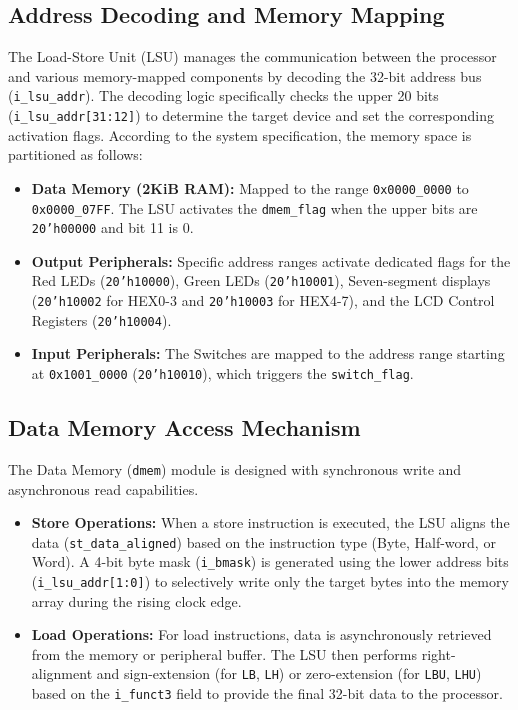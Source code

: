 \subsection{Address Decoding and Memory Mapping}
The Load-Store Unit (LSU) manages the communication between the processor and various memory-mapped components by decoding the 32-bit address bus (\texttt{i\_lsu\_addr}). The decoding logic specifically checks the upper 20 bits (\texttt{i\_lsu\_addr[31:12]}) to determine the target device and set the corresponding activation flags. According to the system specification, the memory space is partitioned as follows:
\begin{itemize}
	\item \textbf{Data Memory (2KiB RAM):} Mapped to the range \texttt{0x0000\_0000} to \texttt{0x0000\_07FF}. The LSU activates the \texttt{dmem\_flag} when the upper bits are \texttt{20'h00000} and bit 11 is 0.
	\item \textbf{Output Peripherals:} Specific address ranges activate dedicated flags for the Red LEDs (\texttt{20'h10000}), Green LEDs (\texttt{20'h10001}), Seven-segment displays (\texttt{20'h10002} for HEX0-3 and \texttt{20'h10003} for HEX4-7), and the LCD Control Registers (\texttt{20'h10004}).
	\item \textbf{Input Peripherals:} The Switches are mapped to the address range starting at \texttt{0x1001\_0000} (\texttt{20'h10010}), which triggers the \texttt{switch\_flag}.
\end{itemize}

\subsection{Data Memory Access Mechanism}
The Data Memory (\texttt{dmem}) module is designed with synchronous write and asynchronous read capabilities.
\begin{itemize}
	\item \textbf{Store Operations:} When a store instruction is executed, the LSU aligns the data (\texttt{st\_data\_aligned}) based on the instruction type (Byte, Half-word, or Word). A 4-bit byte mask (\texttt{i\_bmask}) is generated using the lower address bits (\texttt{i\_lsu\_addr[1:0]}) to selectively write only the target bytes into the memory array during the rising clock edge.
	\item \textbf{Load Operations:} For load instructions, data is asynchronously retrieved from the memory or peripheral buffer. The LSU then performs right-alignment and sign-extension (for \texttt{LB}, \texttt{LH}) or zero-extension (for \texttt{LBU}, \texttt{LHU}) based on the \texttt{i\_funct3} field to provide the final 32-bit data to the processor.
\end{itemize}
\newpage

